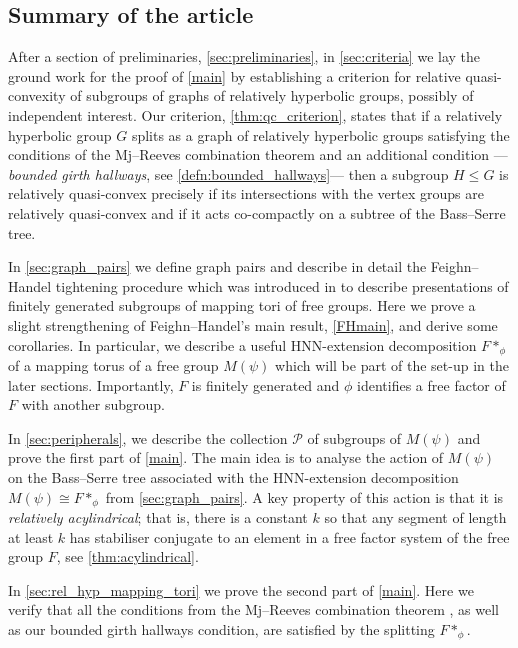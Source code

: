 \documentclass[11pt, a4paper]{amsart}
\theoremstyle{definition}
\begin{document}
\subsection{Summary of the article}

After a section of preliminaries, \cref{sec:preliminaries}, in \cref{sec:criteria} we lay the ground work for the proof of \cref{main} by establishing a criterion for relative quasi-convexity of subgroups of graphs of relatively hyperbolic groups, possibly of independent interest. Our criterion, \cref{thm:qc_criterion}, states that if a relatively hyperbolic group $G$ splits as a graph of relatively hyperbolic groups satisfying the conditions of the Mj--Reeves combination theorem \cite{MR08} and an additional condition ---\emph{bounded girth hallways}, see \cref{defn:bounded_hallways}--- then a subgroup $H\leqslant G$ is relatively quasi-convex precisely if its intersections with the vertex groups are relatively quasi-convex and if it acts co-compactly on a subtree of the Bass--Serre tree.

In \cref{sec:graph_pairs} we define graph pairs and describe in detail the Feighn--Handel tightening procedure which was introduced in \cite{FH99} to describe presentations of finitely generated subgroups of mapping tori of free groups. Here we prove a slight strengthening of Feighn--Handel's main result, \cref{FHmain}, and derive some corollaries. In particular, we describe a useful HNN-extension decomposition $F*_{\phi}$ of a mapping torus of a free group $M(\psi)$ which will be part of the set-up in the later sections. Importantly, $F$ is finitely generated and $\phi$ identifies a free factor of $F$ with another subgroup.

In \cref{sec:peripherals}, we describe the collection $\mathcal{P}$ of subgroups of $M(\psi)$ and prove the first part of \cref{main}. The main idea is to analyse the action of $M(\psi)$ on the Bass--Serre tree associated with the HNN-extension decomposition $M(\psi)\cong F*_{\phi}$ from \cref{sec:graph_pairs}. A key property of this action is that it is \emph{relatively acylindrical}; that is, there is a constant $k$ so that any segment of length at least $k$ has stabiliser conjugate to an element in a free factor system of the free group $F$, see \cref{thm:acylindrical}.

In \cref{sec:rel_hyp_mapping_tori} we prove the second part of \cref{main}. Here we verify that all the conditions from the Mj--Reeves combination theorem \cite{MR08}, as well as our bounded girth hallways condition, are satisfied by the splitting $F*_{\phi}$.
\end{document}
